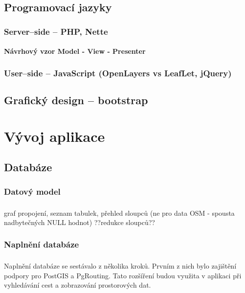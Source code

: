 \documentclass[11pt,a4paper,titlepage,oneside]{book}
\begin{document}
				\paragraph{}
	\section{Programovací jazyky}
		\subsection{Server--side -- PHP, Nette}
			\subsubsection{Návrhový vzor Model - View - Presenter}
		\subsection{User--side -- JavaScript (OpenLayers vs LeafLet, jQuery)}
	\section{Grafický design -- bootstrap \cite{bootstrap}}



\chapter{Vývoj aplikace}
		\section{Databáze}
			\subsection{Datový model}
				\paragraph{} graf propojení, seznam tabulek, přehled sloupců (ne pro data OSM - spousta nadbytečných NULL hodnot) ??redukce sloupců??
			\subsection{Naplnění databáze}
				\paragraph{} Naplnění databáze se sestávalo z několika kroků. Prvním z nich bylo zajištění podpory pro PostGIS a PgRouting. Tato rozšíření budou využita v aplikaci při vyhledávání cest a zobrazování prostorových dat.
\end{document}
